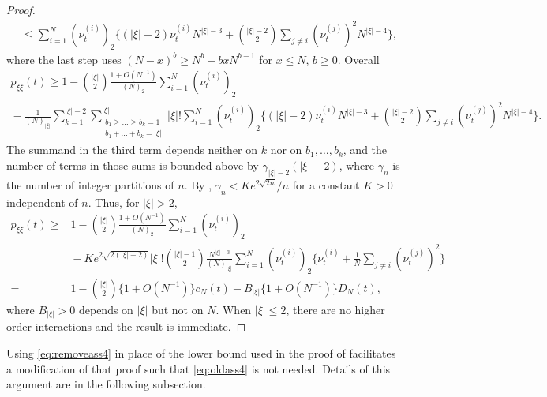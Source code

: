 \documentclass{article}
\theoremstyle{definition}
\newcommand{\1}[1]{\mathbbm{1}_{\{#1\}}}
\begin{document}
\begin{proof}
\begin{align*}
&\leq \sum_{ i = 1 }^N ( \nu_t^{ ( i ) } )_2 \Bigg\{ ( | \xi | - 2 ) \nu_t^{ ( i ) } N^{ | \xi | - 3 } + \binom{ | \xi | - 2 }{ 2 } \sum_{ j \neq i } ( \nu_t^{ ( j ) } )^2 N^{ | \xi | - 4 } \Bigg\},
\end{align*}
where the last step uses $(N - x)^b \geq N^b - b x N^{ b - 1 }$ for $x \leq N$, $b \geq 0$.
Overall
\begin{multline*}
p_{ \xi \xi }( t ) \geq 1 - \binom{ | \xi | }{ 2 } \frac{ 1 + O( N^{ -1 } ) }{ ( N )_2 } \sum_{ i = 1 }^N ( \nu_t^{ ( i ) } )_2 \\
{}- \frac{ 1 }{ ( N )_{ | \xi | } } \sum_{ k = 1 }^{ | \xi | - 2 } \sum_{ \substack{ b_1 \geq \ldots \geq b_k = 1 \\ b_1 + \ldots + b_k = | \xi | } }^{ | \xi | } | \xi |! \sum_{ i = 1 }^N ( \nu_t^{ ( i ) } )_2 \Bigg\{ ( | \xi | - 2 ) \nu_t^{ ( i ) } N^{ | \xi | - 3 } + \binom{ | \xi | - 2 }{ 2 } \sum_{ j \neq i } ( \nu_t^{ ( j ) } )^2 N^{ | \xi | - 4 } \Bigg\}.
\end{multline*}
The summand in the third term depends neither on $k$ nor on $b_1, \ldots, b_k$, and the number of terms in those sums is bounded above by $\gamma_{ | \xi | - 2 } ( | \xi | - 2 )$, where $\gamma_n$ is the number of integer partitions of $n$.
By \citet[Section 2]{hardy1918}, $\gamma_n < K e^{ 2 \sqrt{ 2 n } } / n$ for a constant $K > 0$ independent of $n$.
Thus, for $|\xi| > 2$,
\begin{align*}
p_{ \xi \xi }( t ) \geq {}& 1 - \binom{ | \xi | }{ 2 } \frac{ 1 + O( N^{ -1 } ) }{ ( N )_2 } \sum_{ i = 1 }^N ( \nu_t^{ ( i ) } )_2 \\
& {}- K e^{ 2 \sqrt{ 2 ( | \xi | - 2 ) } } | \xi |! \binom{ | \xi | -1 }{ 2 } \frac{ N^{ | \xi | - 3 } }{ ( N )_{ | \xi | } } \sum_{ i = 1 }^N ( \nu_t^{ ( i ) } )_2 \Bigg\{ \nu_t^{ ( i ) } + \frac{ 1 }{ N } \sum_{ j \neq i } ( \nu_t^{ ( j ) } )^2 \Bigg\} \\
={} & 1 - \binom{ | \xi | }{ 2 } \{ 1 + O( N^{ -1 } ) \} c_N( t ) - B_{ | \xi | } \{ 1 + O( N^{ -1 } ) \} D_N( t ) ,
\end{align*}
where $B_{ | \xi | } > 0$ depends on $| \xi |$ but not on $N$. 
When $|\xi| \leq 2$, there are no higher order interactions and the result is immediate.
\end{proof}
Using \eqref{eq:removeass4} in place of %
the lower bound used in the proof of \citet[Theorem 1]{koskela2018} facilitates a modification of that proof such that \eqref{eq:oldass4} is not needed.
Details of this argument are in the following subsection.
\end{document}
